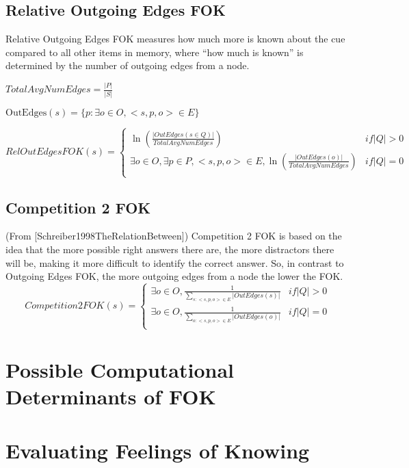 \documentclass[10pt,letterpaper]{article}
\begin{document}
\subsection{Relative Outgoing Edges FOK}

Relative Outgoing Edges FOK measures how much more is known about the cue compared to all other items in memory, where “how much is known” is determined by the number of outgoing edges from a node.

$TotalAvgNumEdges = \frac{|P|}{|S|}$

$\text{OutEdges}(s) = \{p : \exists o{\in}O, <s, p, o>{\in}E \}$

$$RelOutEdgesFOK(s) =
\begin{cases}
    \ln (\frac{|OutEdges(s \in Q)|}{TotalAvgNumEdges}) & {if |Q| > 0} \\
    \exists o{\in}O, \exists p{\in}P, <s, p, o>{\in}E, \ln(\frac{|OutEdges(o)|}{TotalAvgNumEdges}) & {if |Q| = 0} \\
\end{cases}
$$

\subsection{Competition 2 FOK}

(From [Schreiber1998TheRelationBetween])
Competition 2 FOK is based on the idea that the more possible right answers there are, the more distractors there will be, making it more difficult to identify the correct answer. So, in contrast to Outgoing Edges FOK, the more outgoing edges from a node the lower the FOK.
\noindent$$Competition2FOK(s) =
\begin{cases}
    \exists o{\in}O, \frac{1}{\sum\limits_{s: <s, p, o> \in E} {|OutEdges(s)|}} & {if |Q| > 0} \\
    \exists o{\in}O, \frac{1}{\sum\limits_{o: <s, p, o> \in E} {|OutEdges(o)|}} & {if |Q| = 0} \\
\end{cases}
$$

\section{Possible Computational Determinants of FOK}

\section{Evaluating Feelings of Knowing}
\end{document}
